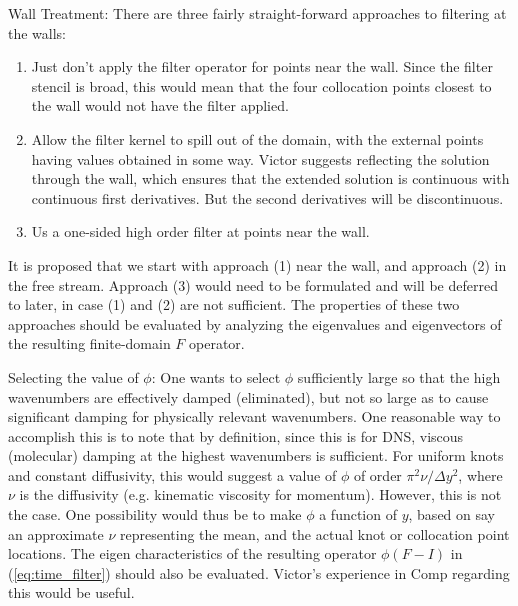 Wall Treatment: There are three fairly straight-forward
approaches to filtering at the walls:
\begin{enumerate}
\item Just don't apply the filter operator for points near the
      wall. Since the filter stencil is broad, this would mean that the
      four collocation points closest to the wall would not have the
      filter applied.
\item Allow the filter kernel to spill out of the domain, with the
      external points having values obtained in some way. Victor
      suggests reflecting the solution through the wall, which ensures
      that the extended solution is continuous with continuous first
      derivatives. But the second derivatives will be discontinuous.
\item Us a one-sided high order filter at points near the wall.
\end{enumerate}
It is proposed that we start with approach (1) near the wall, and
approach (2) in the free stream. Approach (3) would need to be
formulated and will be deferred to later, in case (1) and (2)  are not
sufficient. The properties of these two approaches should be evaluated
by analyzing the eigenvalues and eigenvectors of the resulting
finite-domain $F$ operator.

Selecting the value of $\phi$:
One wants to select $\phi$ sufficiently large so that the high
wavenumbers are effectively damped (eliminated), but not so large as to
cause significant damping for physically relevant wavenumbers. One
reasonable way to accomplish this is to note that by definition, since
this is for DNS, viscous (molecular) damping at the highest wavenumbers
is sufficient. For uniform knots and constant diffusivity, this would
suggest a value of $\phi$ of order $\pi^2\nu/\Delta y^2$, where $\nu$ is
the diffusivity (e.g. kinematic viscosity for momentum). However, this
is not the case. One possibility would thus be to make $\phi$ a function
of $y$, based on say an approximate $\nu$ representing the mean, and the
actual knot or collocation point locations. The eigen characteristics of
the resulting operator $\phi(F-I)$ in (\ref{eq:time_filter}) should also
be evaluated. Victor's experience in Comp regarding this would be useful.


%
